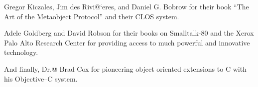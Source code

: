 Gregor Kiczales, Jim des Rivi@`eres, and Daniel G. Bobrow for their
book ``The Art of the Metaobject Protocol'' and their CLOS
system.

Adele Goldberg and David Robson for their books on Smalltalk-80 and
the Xerox Palo Alto Research Center for providing access to much
powerful and innovative technology.

And finally, Dr.@ Brad Cox for pioneering object oriented extensions
to C with his Objective--C system.


